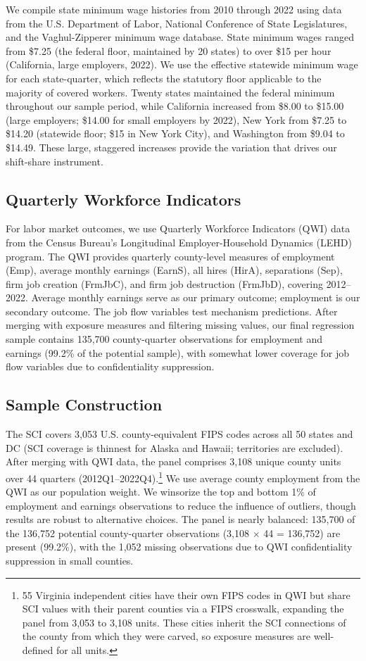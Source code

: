 \documentclass[12pt]{article}
\begin{document}
We compile state minimum wage histories from 2010 through 2022 using data from the U.S. Department of Labor, National Conference of State Legislatures, and the Vaghul-Zipperer minimum wage database. State minimum wages ranged from \$7.25 (the federal floor, maintained by 20 states) to over \$15 per hour (California, large employers, 2022). We use the effective statewide minimum wage for each state-quarter, which reflects the statutory floor applicable to the majority of covered workers. Twenty states maintained the federal minimum throughout our sample period, while California increased from \$8.00 to \$15.00 (large employers; \$14.00 for small employers by 2022), New York from \$7.25 to \$14.20 (statewide floor; \$15 in New York City), and Washington from \$9.04 to \$14.49. These large, staggered increases provide the variation that drives our shift-share instrument.

\subsection{Quarterly Workforce Indicators}

For labor market outcomes, we use Quarterly Workforce Indicators (QWI) data from the Census Bureau's Longitudinal Employer-Household Dynamics (LEHD) program. The QWI provides quarterly county-level measures of employment (Emp), average monthly earnings (EarnS), all hires (HirA), separations (Sep), firm job creation (FrmJbC), and firm job destruction (FrmJbD), covering 2012--2022. Average monthly earnings serve as our primary outcome; employment is our secondary outcome. The job flow variables test mechanism predictions. After merging with exposure measures and filtering missing values, our final regression sample contains 135,700 county-quarter observations for employment and earnings (99.2\% of the potential sample), with somewhat lower coverage for job flow variables due to confidentiality suppression.

\subsection{Sample Construction}

The SCI covers 3,053 U.S. county-equivalent FIPS codes across all 50 states and DC (SCI coverage is thinnest for Alaska and Hawaii; territories are excluded). After merging with QWI data, the panel comprises 3,108 unique county units over 44 quarters (2012Q1--2022Q4).\footnote{55 Virginia independent cities have their own FIPS codes in QWI but share SCI values with their parent counties via a FIPS crosswalk, expanding the panel from 3,053 to 3,108 units. These cities inherit the SCI connections of the county from which they were carved, so exposure measures are well-defined for all units.} We use average county employment from the QWI as our population weight. We winsorize the top and bottom 1\% of employment and earnings observations to reduce the influence of outliers, though results are robust to alternative choices. The panel is nearly balanced: 135,700 of the 136,752 potential county-quarter observations (3,108 $\times$ 44 = 136,752) are present (99.2\%), with the 1,052 missing observations due to QWI confidentiality suppression in small counties.
\end{document}
